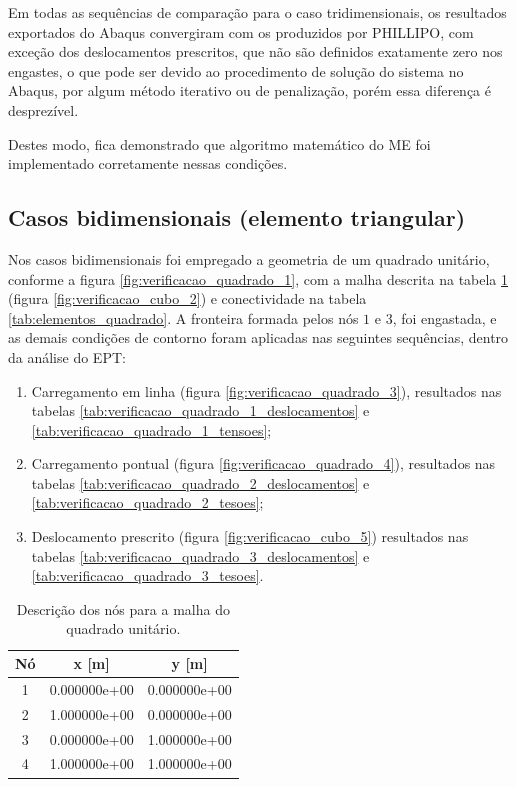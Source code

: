 Em todas as sequências de comparação para o caso tridimensionais, os resultados exportados do Abaqus convergiram com os produzidos por PHILLIPO, com exceção dos deslocamentos prescritos, que não são definidos exatamente zero nos engastes, o que pode ser devido ao procedimento de solução do sistema no Abaqus, por algum método iterativo ou de penalização, porém essa diferença é desprezível.

Destes modo, fica demonstrado que algoritmo matemático do ME foi implementado corretamente nessas condições. 

\subsection{Casos bidimensionais (elemento triangular)}

Nos casos bidimensionais foi empregado a geometria de um quadrado unitário, conforme a figura \ref{fig:verificacao_quadrado_1}, com a malha descrita na tabela \ref{tab:nos_quadrado} (figura \ref{fig:verificacao_cubo_2}) e conectividade na tabela \ref{tab:elementos_quadrado}. A fronteira formada pelos nós $1$ e $3$, foi engastada, e as demais condições de contorno foram aplicadas nas seguintes sequências, dentro da análise do EPT:

\begin{enumerate}
    \item Carregamento em linha (figura \ref{fig:verificacao_quadrado_3}), resultados nas tabelas \ref{tab:verificacao_quadrado_1_deslocamentos} e \ref{tab:verificacao_quadrado_1_tensoes};
    \item Carregamento pontual (figura \ref{fig:verificacao_quadrado_4}), resultados nas tabelas \ref{tab:verificacao_quadrado_2_deslocamentos} e \ref{tab:verificacao_quadrado_2_tesoes};
    \item Deslocamento prescrito (figura \ref{fig:verificacao_cubo_5}) resultados nas tabelas \ref{tab:verificacao_quadrado_3_deslocamentos} e \ref{tab:verificacao_quadrado_3_tesoes}.
\end{enumerate}

\begin{table}
    \centering
    \caption{Descrição dos nós para a malha do quadrado unitário.}
    \begin{tabular}{c | c c}
        \toprule
        \textbf{Nó} & \textbf{x} [m]  & \textbf{y}  [m] \\
        \midrule
        1 & 0.000000e+00 & 0.000000e+00 \\
        2 & 1.000000e+00 & 0.000000e+00 \\
        3 & 0.000000e+00 & 1.000000e+00 \\
        4 & 1.000000e+00 & 1.000000e+00 \\
        \bottomrule
    \end{tabular}
    \label{tab:nos_quadrado}
\end{table}

